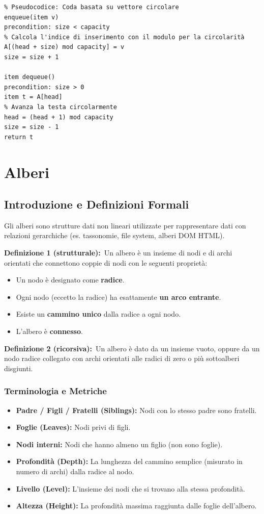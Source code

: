 \documentclass[12pt, a4paper]{article}
\begin{document}
\begin{verbatim}
% Pseudocodice: Coda basata su vettore circolare
enqueue(item v)
precondition: size < capacity
% Calcola l'indice di inserimento con il modulo per la circolarità
A[(head + size) mod capacity] = v
size = size + 1

item dequeue()
precondition: size > 0
item t = A[head]
% Avanza la testa circolarmente
head = (head + 1) mod capacity
size = size - 1
return t
\end{verbatim}


\section{Alberi}

\subsection{Introduzione e Definizioni Formali}
Gli alberi sono strutture dati non lineari utilizzate per rappresentare dati con relazioni gerarchiche (es. tassonomie, file system, alberi DOM HTML).

\begin{tcolorbox}[colback=lightergray!10, colframe=tocsec, title=\textbf{Definizioni di Albero Radicato}]
\textbf{Definizione 1 (strutturale):}\
Un albero è un insieme di nodi e di archi orientati che connettono coppie di nodi con le seguenti proprietà:
\begin{itemize}
\item Un nodo è designato come \textbf{radice}.
\item Ogni nodo (eccetto la radice) ha esattamente \textbf{un arco entrante}.
\item Esiste un \textbf{cammino unico} dalla radice a ogni nodo.
\item L'albero è \textbf{connesso}.
\end{itemize}

\textbf{Definizione 2 (ricorsiva):}\
Un albero è dato da un insieme vuoto, oppure da un nodo radice collegato con archi orientati alle radici di zero o più sottoalberi disgiunti.
\end{tcolorbox}

\subsubsection{Terminologia e Metriche}
\begin{itemize}
\item \textbf{Padre / Figli / Fratelli (Siblings):} Nodi con lo stesso padre sono fratelli.
\item \textbf{Foglie (Leaves):} Nodi privi di figli.
\item \textbf{Nodi interni:} Nodi che hanno almeno un figlio (non sono foglie).
\item \textbf{Profondità (Depth):} La lunghezza del cammino semplice (misurato in numero di archi) dalla radice al nodo.
\item \textbf{Livello (Level):} L'insieme dei nodi che si trovano alla stessa profondità.
\item \textbf{Altezza (Height):} La profondità massima raggiunta dalle foglie dell'albero.
\end{itemize}
\end{document}
